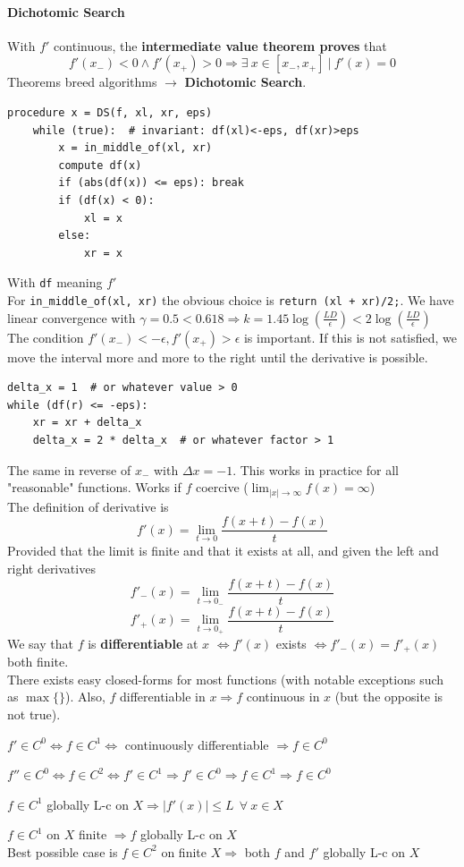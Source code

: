 \documentclass[10pt]{report}
\begin{document}
\paragraph{Dichotomic Search} With $f'$ continuous, the \textbf{intermediate value theorem proves} that  $$f'(x_-) < 0 \wedge f'(x_+) > 0 \Rightarrow \exists\:x\in[x_-, x_+]\:|\: f'(x) = 0$$
Theorems breed algorithms $\rightarrow$ \textbf{Dichotomic Search}.
\begin{lstlisting}[style=myPython]
procedure x = DS(f, xl, xr, eps)
	while (true):  # invariant: df(xl)<-eps, df(xr)>eps
		x = in_middle_of(xl, xr)
		compute df(x)
		if (abs(df(x)) <= eps): break
		if (df(x) < 0):
			xl = x
		else:
			xr = x
\end{lstlisting}
With \texttt{df} meaning $f'$\\
For \texttt{in\_middle\_of(xl, xr)} the obvious choice is \texttt{return (xl + xr)/2;}. We have linear convergence with $\gamma = 0.5 < 0.618 \Rightarrow k = 1.45\log(\frac{LD}{\epsilon}) < 2 \log(\frac{LD}{\epsilon})$\\
The condition $f'(x_-) < -\epsilon, f'(x_+) > \epsilon$ is important. If this is not satisfied, we move the interval more and more to the right until the derivative is possible.
\begin{lstlisting}[style=myPython]
delta_x = 1  # or whatever value > 0
while (df(r) <= -eps):
	xr = xr + delta_x
	delta_x = 2 * delta_x  # or whatever factor > 1
\end{lstlisting}
The same in reverse of $x_-$ with $\Delta x = -1$. This works in practice for all "reasonable" functions. Works if $f$ coercive ($\lim_{|x| \to \infty} f(x) = \infty$)\\
The definition of derivative is
$$f'(x) = \lim_{t\to 0} \frac{f(x+t)-f(x)}{t}$$
Provided that the limit is finite and that it exists at all, and given the left and right derivatives
$$f'_-(x) = \lim_{t\to 0_-} \frac{f(x+t)-f(x)}{t}$$
$$f'_+(x) = \lim_{t\to 0_+} \frac{f(x+t)-f(x)}{t}$$
We say that $f$ is \textbf{differentiable} at $x$ $\Leftrightarrow f'(x)$ exists $\Leftrightarrow f'_-(x)=f'_+(x)$ both finite.\\
There exists easy closed-forms for most functions (with notable exceptions such as $\max\{\}$). Also, $f$ differentiable in $x \Rightarrow f$ continuous in $x$ (but the opposite is not true).
\begin{list}{}{}
	\item $f' \in C^0 \Leftrightarrow f \in C^1 \Leftrightarrow$ continuously differentiable $\Rightarrow f\in C^0$
	\item $f'' \in C^0 \Leftrightarrow f\in C^2 \Leftrightarrow f' \in C^1 \Rightarrow f' \in C^0 \Rightarrow f \in C^1 \Rightarrow f \in C^0$
	\item $f \in C^1$ globally L-c on $X \Rightarrow |f'(x)| \leq L\:\:\forall\: x \in X$
\end{list}
$f\in C^1$ on $X$ finite $\Rightarrow f$ globally L-c on $X$\\
Best possible case is $f\in C^2$ on finite $X\Rightarrow$ both $f$ and $f'$ globally L-c on $X$
\end{document}
